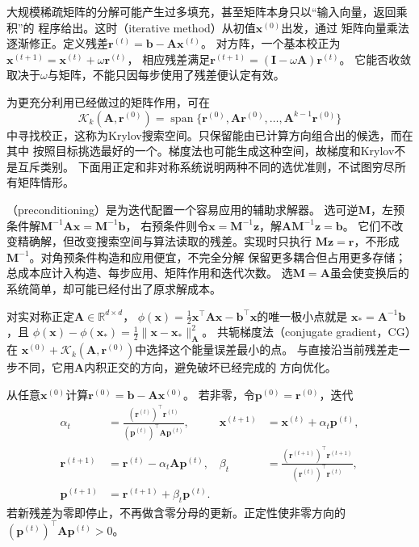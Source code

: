 大规模稀疏矩阵的分解可能产生过多填充，甚至矩阵本身只以“输入向量，返回乘积”的
程序给出。这时（iterative method）从初值$\bm x^{(0)}$出发，通过
矩阵向量乘法逐渐修正。定义残差$\bm r^{(t)}=\bm b-\bm A\bm x^{(t)}$。
对方阵，一个基本校正为
$\bm x^{(t+1)}=\bm x^{(t)}+\omega\bm r^{(t)}$，
相应残差满足$\bm r^{(t+1)}=(\bm I-\omega\bm A)\bm r^{(t)}$。
它能否收敛取决于$\omega$与矩阵，不能只因每步使用了残差便认定有效。

为更充分利用已经做过的矩阵作用，可在
\[
 \mathcal K_k(\bm A,\bm r^{(0)})
 =\operatorname{span}\{\bm r^{(0)},\bm A\bm r^{(0)},\ldots,
                           \bm A^{k-1}\bm r^{(0)}\}
\]
中寻找校正，这称为Krylov搜索空间。只保留能由已计算方向组合出的候选，而在其中
按照目标挑选最好的一个。梯度法也可能生成这种空间，故梯度和Krylov不是互斥类别。
下面用正定和非对称系统说明两种不同的选优准则，不试图穷尽所有矩阵情形。

（preconditioning）是为迭代配置一个容易应用的辅助求解器。
选可逆$\bm M$，左预条件解$\bm M^{-1}\bm A\bm x=\bm M^{-1}\bm b$，
右预条件则令$\bm x=\bm M^{-1}\bm z$，解$\bm A\bm M^{-1}\bm z=\bm b$。
它们不改变精确解，但改变搜索空间与算法读取的残差。实现时只执行
$\bm M\bm z=\bm r$，不形成$\bm M^{-1}$。对角预条件构造和应用便宜，不完全分解
保留更多耦合但占用更多存储；总成本应计入构造、每步应用、矩阵作用和迭代次数。
选$\bm M=\bm A$虽会使变换后的系统简单，却可能已经付出了原求解成本。


对实对称正定$\bm A\in\mathbb R^{d\times d}$，
$\phi(\bm x)=\tfrac12\bm x^\top\bm A\bm x-\bm b^\top\bm x$的唯一极小点就是
$\bm x_*=\bm A^{-1}\bm b$，且
$\phi(\bm x)-\phi(\bm x_*)=\tfrac12\lVert\bm x-\bm x_*\rVert_{\bm A}^2$。
共轭梯度法（conjugate gradient，CG）在
$\bm x^{(0)}+\mathcal K_k(\bm A,\bm r^{(0)})$中选择这个能量误差最小的点。
与直接沿当前残差走一步不同，它用$\bm A$内积正交的方向，避免破坏已经完成的
方向优化。

从任意$\bm x^{(0)}$计算$\bm r^{(0)}=\bm b-\bm A\bm x^{(0)}$。
若非零，令$\bm p^{(0)}=\bm r^{(0)}$，迭代
\begin{align*}
 \alpha_t&=\frac{(\bm r^{(t)})^\top\bm r^{(t)}}
                 {(\bm p^{(t)})^\top\bm A\bm p^{(t)}},&
 \bm x^{(t+1)}&=\bm x^{(t)}+\alpha_t\bm p^{(t)},\\
 \bm r^{(t+1)}&=\bm r^{(t)}-\alpha_t\bm A\bm p^{(t)},&
 \beta_t&=\frac{(\bm r^{(t+1)})^\top\bm r^{(t+1)}}
                {(\bm r^{(t)})^\top\bm r^{(t)}},\\
 \bm p^{(t+1)}&=\bm r^{(t+1)}+\beta_t\bm p^{(t)}.
\end{align*}
若新残差为零即停止，不再做含零分母的更新。正定性使非零方向的
$(\bm p^{(t)})^\top\bm A\bm p^{(t)}>0$。

